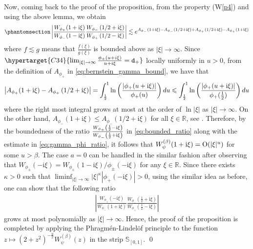 \documentclass[12pt]{amsart}
\newcommand{\hlabel}{\phantomsection\label}
\newcommand{\hptg}[2]{\hypertarget{#1}{#2}}
\numberwithin{equation}{section}
\newcommand{\bb}{\mathbb}
\renewcommand{\le}{\leqslant}
\newcommand{\ttt}{\mathtt}
\renewcommand{\i}{\mathrm{i}}
\theoremstyle{definition}
\theoremstyle{assump}
\theoremstyle{remark}
\begin{document}
{Now, coming back to the proof of the proposition, from the property (W\ref{p4}) and using the above lemma, we obtain
\begin{align}\hlabel{eq:bounded_ratio}
	\left|\frac{W_{\phi_+}(1+\mathrm{i}\xi)}{W_{\phi_-}(1-\mathrm{i}\xi)}\frac{W_{\phi_-}\left(1/2+\mathrm{i}\xi\right)}{W_{\phi_+}\left(1/2-\mathrm{i}\xi\right)}\right|\lesssim e^{A_{\phi_-}(1+\mathrm{i}\xi)-A_{\phi_-}\left(1/2+{\rm{i}}\xi\right)+A_{\phi_+}\left(1/2+{\rm{i}}\xi\right)-A_{\phi_+}(1+\mathrm{i}\xi)}
\end{align}
where $f\lesssim g$ means that  $\frac{f(\xi)}{g(\xi)}$ is bounded above as $|\xi|\to\infty$.
Since $\hptg{C34}{\lim_{|\xi|\to\infty}\frac{\phi_+(u+i\xi)}{u+i\xi}=\ttt{d}_+}$ locally uniformly in $u>0$, from the definition of $A_{\phi_+}$ in \eqref{eq:bernstein_gamma_bound}, we have that
\hptg{C35}{
\begin{align*}
	\left|A_{\phi_+}(1+\mathrm{i}\xi)-A_{\phi_+}\left(1/2+{\rm{i}}\xi\right)\right|=\int_{\frac{1}{2}}^1\ln\left(\frac{|\phi_+(u+\i\xi)|}{\phi_+(u)}\right)du\le\int_{\frac{1}{2}}^1\ln\left(\frac{|\phi_+(u+\i\xi)|}{\phi_+(\frac{1}{2})}\right)du
\end{align*}}
where the right most integral grows at most at the order of $\ln|\xi|$ as $|\xi|\to\infty$.
On the other hand, $A_{\phi_-}(1+\i\xi)\le A_{\phi_-}(1/2+\i\xi)$ for all $\xi\in\bb R$, see \cite[Theorem~3.2(1)]{patie2018}. Therefore, by the boundedness of the ratio $\frac{W_{\phi_+}\left(\frac{1}{2}-{\rm{i}}\xi\right)}{W_{\phi_-}\left(\frac{1}{2}+{\rm{i}}\xi\right)}$ in \eqref{eq:bounded_ratio} along with the estimate in \eqref{eq:gamma_phi_ratio}, it follows that $W^{(\beta)}_\psi(1+{\rm{i}}\xi)=\mathrm{O}(|\xi|^u)$ for some $u>\beta$. The case $a=0$ can be handled in the similar fashion after observing that $W_{\phi_\pm}(-\i\xi)=W_{\phi_\pm}(1-\i\xi)/\phi_\pm(-\i\xi)$ for any $\xi\in\bb{R}$. Since there exists $\kappa>0$ such that $\liminf_{|\xi|\to\infty} |\xi|^\kappa|\phi_+(-\i\xi)|>0$, using the similar idea as before, one can show that the following ratio
\begin{align*}
	\left|\frac{W_{\phi_+}(-\i\xi)}{W_{\phi_-}(1+\mathrm{i}\xi)}\frac{W_{\phi_-}\left(\frac{1}{2}+\mathrm{i}\xi\right)}{W_{\phi_+}\left(\frac{1}{2}-\mathrm{i}\xi\right)}\right|
\end{align*}
grows at most polynomially as $|\xi|\to\infty$. Hence, the proof of the proposition is completed by applying the Phragm\'en-Lindel\"of principle to the function $z\mapsto(2+z^2)^{-\frac{u}{2}}W^{(\beta)}_\psi(z)$ in the strip $\bb{S}_{[0,1]}$. \qed

}
\end{document}
